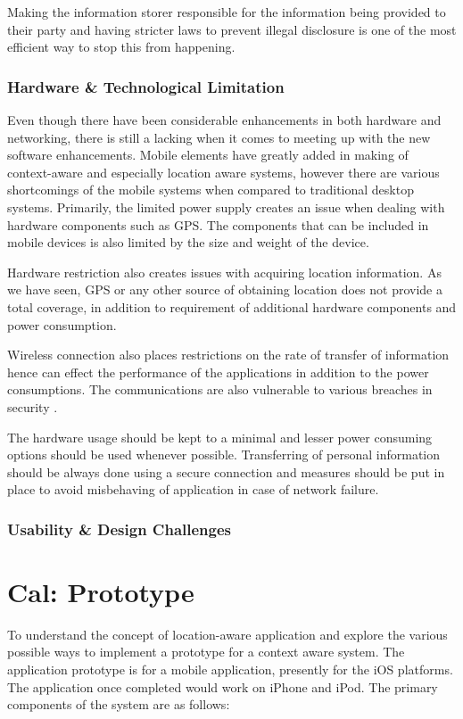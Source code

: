 \documentclass[12pt]{report}
\begin{document}
Making the information storer responsible for the information being provided to their party and having stricter laws to prevent illegal disclosure is one of the most efficient way to stop this from happening.

\subsection{Hardware \& Technological Limitation}
Even though there have been considerable enhancements in both hardware and networking, there is still a lacking when it comes to meeting up with the new software enhancements. Mobile elements have greatly added in making of context-aware and especially location aware systems, however there are various shortcomings of the mobile systems when compared to traditional desktop systems. Primarily, the limited power supply creates an issue when dealing with hardware components such as GPS.  The components that can be included in mobile devices is also limited by the size and weight of the device.

Hardware restriction also creates issues with acquiring location information. As we have seen, GPS or any other source of obtaining location does not provide a total coverage, in addition to requirement of additional hardware components and power consumption.

Wireless connection also places restrictions on the rate of transfer of information hence can effect the performance of the applications in addition to the power consumptions. The communications are also vulnerable to various breaches in security \cite{patterson2003challenges}.

The hardware usage should be kept to a minimal and lesser power consuming options should be used whenever possible. Transferring of personal information should be always done using a secure connection and measures should be put in place to avoid misbehaving of application in case of network failure.

\subsection{Usability \& Design Challenges}

\chapter{Cal: Prototype}
To understand the concept of location-aware application and explore the various possible ways to implement a prototype for a context aware system. The application prototype is for a mobile application, presently for the iOS platforms. The application once completed would work on iPhone and iPod. The primary components of the system are as follows:
\end{document}
